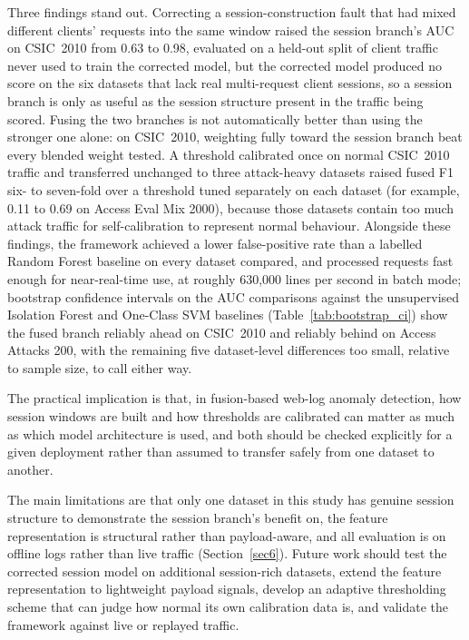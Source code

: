 \documentclass[futureinternet,article,submit,moreauthors]{Definitions/mdpi}
\begin{document}
Three findings stand out. Correcting a session-construction fault that had mixed different clients' requests into the same window raised the session branch's AUC on CSIC~2010 from 0.63 to 0.98, evaluated on a held-out split of client traffic never used to train the corrected model, but the corrected model produced no score on the six datasets that lack real multi-request client sessions, so a session branch is only as useful as the session structure present in the traffic being scored. Fusing the two branches is not automatically better than using the stronger one alone: on CSIC~2010, weighting fully toward the session branch beat every blended weight tested. A threshold calibrated once on normal CSIC~2010 traffic and transferred unchanged to three attack-heavy datasets raised fused F1 six- to seven-fold over a threshold tuned separately on each dataset (for example, 0.11 to 0.69 on Access Eval Mix 2000), because those datasets contain too much attack traffic for self-calibration to represent normal behaviour. Alongside these findings, the framework achieved a lower false-positive rate than a labelled Random Forest baseline on every dataset compared, and processed requests fast enough for near-real-time use, at roughly 630{,}000 lines per second in batch mode; bootstrap confidence intervals on the AUC comparisons against the unsupervised Isolation Forest and One-Class SVM baselines (Table~\ref{tab:bootstrap_ci}) show the fused branch reliably ahead on CSIC~2010 and reliably behind on Access Attacks 200, with the remaining five dataset-level differences too small, relative to sample size, to call either way.

The practical implication is that, in fusion-based web-log anomaly detection, how session windows are built and how thresholds are calibrated can matter as much as which model architecture is used, and both should be checked explicitly for a given deployment rather than assumed to transfer safely from one dataset to another.

The main limitations are that only one dataset in this study has genuine session structure to demonstrate the session branch's benefit on, the feature representation is structural rather than payload-aware, and all evaluation is on offline logs rather than live traffic (Section~\ref{sec6}). Future work should test the corrected session model on additional session-rich datasets, extend the feature representation to lightweight payload signals, develop an adaptive thresholding scheme that can judge how normal its own calibration data is, and validate the framework against live or replayed traffic.
\end{document}
